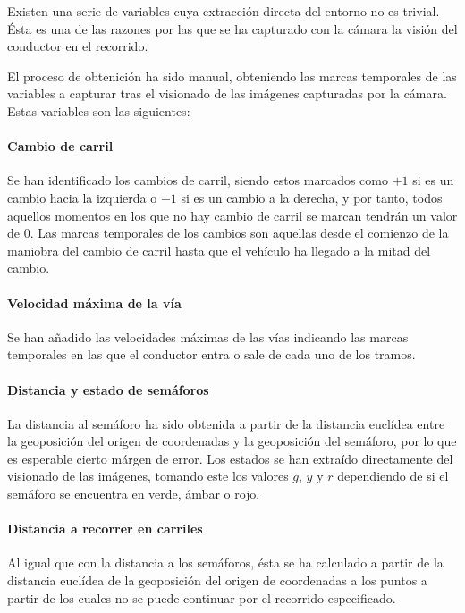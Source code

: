 Existen una serie de variables cuya extracción directa del entorno no es trivial. Ésta es una de las razones por las que se ha capturado con la cámara la visión del conductor en el recorrido.

El proceso de obtenición ha sido manual, obteniendo las marcas temporales de las variables a capturar tras el visionado de las imágenes capturadas por la cámara. Estas variables son las siguientes:

\paragraph{Cambio de carril}

Se han identificado los cambios de carril, siendo estos marcados como $+1$ si es un cambio hacia la izquierda o $-1$ si es un cambio a la derecha, y por tanto, todos aquellos momentos en los que no hay cambio de carril se marcan tendrán un valor de $0$. Las marcas temporales de los cambios son aquellas desde el comienzo de la maniobra del cambio de carril hasta que el vehículo ha llegado a la mitad del cambio.

\paragraph{Velocidad máxima de la vía}

Se han añadido las velocidades máximas de las vías indicando las marcas temporales en las que el conductor entra o sale de cada uno de los tramos.

\paragraph{Distancia y estado de semáforos}

La distancia al semáforo ha sido obtenida a partir de la distancia euclídea entre la geoposición del origen de coordenadas y la geoposición del semáforo, por lo que es esperable cierto márgen de error. Los estados se han extraído directamente del visionado de las imágenes, tomando este los valores $g$, $y$ y $r$ dependiendo de si el semáforo se encuentra en verde, ámbar o rojo.

\paragraph{Distancia a recorrer en carriles}

Al igual que con la distancia a los semáforos, ésta se ha calculado a partir de la distancia euclídea de la geoposición del origen de coordenadas a los puntos a partir de los cuales no se puede continuar por el recorrido especificado.

